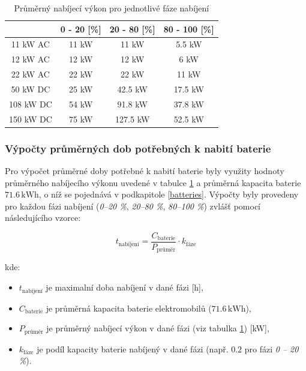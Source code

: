 \documentclass[a4paper,11pt]{article}
\begin{document}
\begin{table}[H]
    \centering 
    \vspace{0.5cm} %
    \begin{tabular}{|c|c|c|c|}
        \hline
        \textbf{} & \textbf{0 - 20 [\%]} & \textbf{20 - 80 [\%]} & \textbf{80 - 100 [\%]}\\
        \hline
        11 kW AC  &  11 kW  & 11 kW & 5.5 kW     \\
        \hline
        12 kW AC  &  12 kW  & 12 kW & 6 kW     \\
        \hline
        22 kW AC  &  22 kW  & 22 kW & 11 kW  \\
        \hline
        50 kW DC  &  25 kW  & 42.5 kW & 17.5 kW    \\
        \hline
        108 kW DC &  54 kW  & 91.8 kW & 37.8 kW \\
        \hline
        150 kW DC &  75 kW  & 127.5 kW & 52.5 kW \\
        \hline
    \end{tabular}
    \caption{Průměrný nabíjecí výkon pro jednotlivé fáze nabíjení}
    \label{table:average-charging-power}
    \vspace{0.5cm} %
\end{table}


\subsubsection{Výpočty průměrných dob potřebných k nabití baterie}

Pro výpočet průměrné doby potřebné k nabití baterie byly využity hodnoty průměrného nabíjecího výkonu uvedené v tabulce \ref{table:average-charging-power} a průměrná kapacita baterie \(71.6 \, \mathrm{kWh}\), o níž se pojednává v podkapitole \ref{batteries}. Výpočty byly provedeny pro každou fázi nabíjení (\textit{0–20 \%}, \textit{20–80 \%}, \textit{80–100 \%}) zvlášť pomocí následujícího vzorce:

\[
t_{\text{nabíjení}} = \frac{C_{\text{baterie}}}{P_{\text{průměr}}} \cdot k_{\text{fáze}}
\]

kde:
\begin{itemize}
    \item \(t_{\text{nabíjení}}\) je maximalní doba nabíjení v dané fázi [h],
    \item \(C_{\text{baterie}}\) je průměrná kapacita baterie elektromobilů (\(71.6 \, \mathrm{kWh}\)),
    \item \(P_{\text{průměr}}\) je průměrný nabíjecí výkon v dané fázi (viz tabulka \ref{table:average-charging-power}) [kW],
    \item \(k_{\text{fáze}}\) je podíl kapacity baterie nabíjený v dané fázi (např. \(0.2\) pro fázi \textit{0 -- 20 \%}).\\
\end{itemize}
\end{document}
